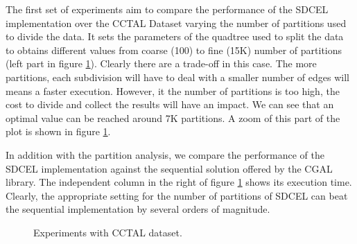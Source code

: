 The first set of experiments aim to compare the performance of the SDCEL implementation over the CCTAL Dataset varying the number of partitions used to divide the data. It sets the parameters of the quadtree used to split the data to obtains different values from coarse (100) to fine (15K) number of partitions (left part in figure \ref{fig:ca}).  Clearly there are a trade-off in this case.  The more partitions, each subdivision will have to deal with a smaller number of edges will means a faster execution.  However, it the number of partitions is too high, the cost to divide and collect the results will have an impact.  We can see that an optimal value can be reached around 7K partitions.  A zoom of this part of the plot is shown in figure \ref{fig:ca}.

In addition with the partition analysis, we compare the performance of the SDCEL implementation against the sequential solution offered by the CGAL library.  The independent column in the right of figure \ref{fig:ca} shows its execution time.  Clearly, the appropriate setting for the number of partitions of SDCEL can beat the sequential implementation by several orders of magnitude.

\begin{figure}[!ht]
    \centering
    \hfill
    \caption{Experiments with CCTAL dataset. \label{fig:ca}} 
\end{figure}

